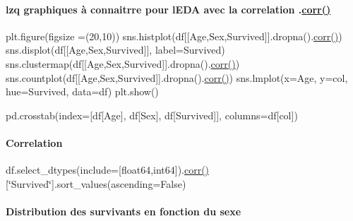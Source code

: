 \paragraph*{lzq graphiques à connaitrre pour l\textquotesingle{}E\+DA avec la correlation .\hyperlink{namespaceex__pipeline__with__param_a023e948f87c4d7ce264150124c637e55}{corr()}}

plt.\+figure(figsize =(20,10)) sns.\+histplot(df\mbox{[}\mbox{[}\textquotesingle{}Age\textquotesingle{},\textquotesingle{}Sex\textquotesingle{},\textquotesingle{}Survived\textquotesingle{}\mbox{]}\mbox{]}.dropna().\hyperlink{namespaceex__pipeline__with__param_a023e948f87c4d7ce264150124c637e55}{corr()}) sns.\+displot(df\mbox{[}\mbox{[}\textquotesingle{}Age\textquotesingle{},\textquotesingle{}Sex\textquotesingle{},\textquotesingle{}Survived\textquotesingle{}\mbox{]}\mbox{]}, label=\textquotesingle{}Survived\textquotesingle{}) sns.\+clustermap(df\mbox{[}\mbox{[}\textquotesingle{}Age\textquotesingle{},\textquotesingle{}Sex\textquotesingle{},\textquotesingle{}Survived\textquotesingle{}\mbox{]}\mbox{]}.dropna().\hyperlink{namespaceex__pipeline__with__param_a023e948f87c4d7ce264150124c637e55}{corr()}) sns.\+countplot(df\mbox{[}\mbox{[}\textquotesingle{}Age\textquotesingle{},\textquotesingle{}Sex\textquotesingle{},\textquotesingle{}Survived\textquotesingle{}\mbox{]}\mbox{]}.dropna().\hyperlink{namespaceex__pipeline__with__param_a023e948f87c4d7ce264150124c637e55}{corr()}) sns.\+lmplot(x=\textquotesingle{}Age\textquotesingle{}, y=col, hue=\textquotesingle{}Survived\textquotesingle{}, data=df) plt.\+show()

pd.\+crosstab(index=\mbox{[}df\mbox{[}\textquotesingle{}Age\textquotesingle{}\mbox{]}, df\mbox{[}\textquotesingle{}Sex\textquotesingle{}\mbox{]}, df\mbox{[}\textquotesingle{}Survived\textquotesingle{}\mbox{]}\mbox{]}, columns=df\mbox{[}col\mbox{]})

\paragraph*{Correlation}

df.\+select\+\_\+dtypes(include=\mbox{[}\textquotesingle{}float64\textquotesingle{},\textquotesingle{}int64\textquotesingle{}\mbox{]}).\hyperlink{namespaceex__pipeline__with__param_a023e948f87c4d7ce264150124c637e55}{corr()}\mbox{[}\char`\"{}\+Survived\char`\"{}\mbox{]}.sort\+\_\+values(ascending=False)

\paragraph*{Distribution des survivants en fonction du sexe}

